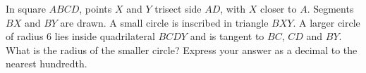 In square $ABCD$, points $X$ and $Y$ trisect side $AD$, with $X$ closer to $A$. Segments $BX$ and $BY$ are drawn. A small circle is inscribed in triangle $BXY$. A larger circle of radius $6$ lies inside quadrilateral $BCDY$ and is tangent to $BC$, $CD$ and $BY$. What is the radius of the smaller circle? Express your answer as a decimal to the nearest hundredth.
